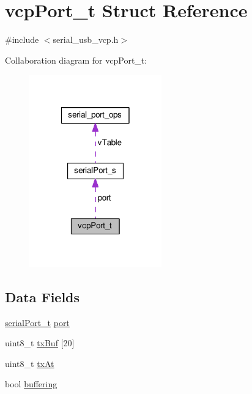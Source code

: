 \hypertarget{structvcpPort__t}{\section{vcp\+Port\+\_\+t Struct Reference}
\label{structvcpPort__t}
}


{\ttfamily \#include $<$serial\+\_\+usb\+\_\+vcp.\+h$>$}



Collaboration diagram for vcp\+Port\+\_\+t\+:\nopagebreak
\begin{figure}[H]
\begin{center}
\leavevmode
\includegraphics[width=162pt]{structvcpPort__t__coll__graph}
\end{center}
\end{figure}
\subsection*{Data Fields}
\begin{DoxyCompactItemize}
\item 
\hyperlink{drivers_2serial_8h_a64a5e2f04e1a908fbb1b3b165f88e0ef}{serial\+Port\+\_\+t} \hyperlink{structvcpPort__t_a0089d108d978241d7f11437160b67e2d}{port}
\item 
uint8\+\_\+t \hyperlink{structvcpPort__t_aacdb51830d2928fa4a1e22d94056fea0}{tx\+Buf} \mbox{[}20\mbox{]}
\item 
uint8\+\_\+t \hyperlink{structvcpPort__t_ac68687ac1ea4e6b59496f17ab0316b2b}{tx\+At}
\item 
bool \hyperlink{structvcpPort__t_afea07a6631e9aab2a70165599c22dff8}{buffering}
\end{DoxyCompactItemize}


